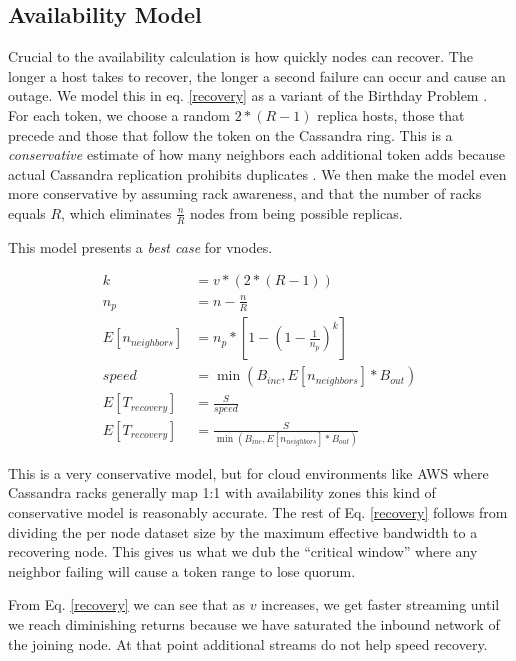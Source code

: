 \documentclass{article}
\begin{document}
\subsection{Availability Model}

Crucial to the availability calculation is how quickly nodes can recover. The
longer a host takes to recover, the longer a second failure can occur and cause
an outage. We model this in eq. \ref{recovery} as a variant of the Birthday
Problem \cite{neighbors}. For each token, we choose a random $2 * (R - 1)$
replica hosts, those that precede and those that follow the token on the
Cassandra ring. This is a \textit{conservative} estimate of how many neighbors
each additional token adds because actual Cassandra replication prohibits
duplicates \cite{replication}. We then make the model even more conservative by
assuming rack awareness, and that the number of racks equals $R$, which
eliminates $\frac{n}{R}$ nodes from being possible replicas.

This model presents a \textit{best case} for vnodes.

\begin{subequations} \label{recovery}
    \begin{align}
        k & = v * (2 * (R - 1)) \\ \label{recoverya}
        n_{p} & = n - \frac{n}{R} \\
        E[n_{neighbors}] & = n_{p} * [1 - (1-\frac{1}{n_{p}})^k] \label{recoveryc} \\
        speed & = \min(B_{inc}, E[n_{neighbors}] * B_{out}) \\
        E[T_{recovery}] & = \frac{S}{speed} \\
        E[T_{recovery}] & = \frac{S}{\min(B_{inc}, E[n_{neighbors}] * B_{out})}
    \end{align}
\end{subequations}

This is a very conservative model, but for cloud environments like AWS where
Cassandra racks generally map 1:1 with availability zones this kind of
conservative model is reasonably accurate. The rest of Eq. \ref{recovery} follows
from dividing the per node dataset size by the maximum effective bandwidth to
a recovering node. This gives us what we dub the ``critical window''
where any neighbor failing will cause a token range to lose quorum.

From Eq. \ref{recovery} we can see that as $v$ increases, we get faster
streaming until we reach diminishing returns because we have saturated the
inbound network of the joining node. At that point additional streams do not
help speed recovery.
\end{document}
